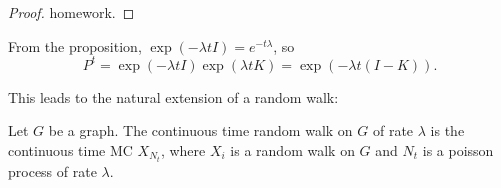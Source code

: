\begin{proof}
homework.
\end{proof}

From the proposition, $\exp(-\lambda t I) = e^{-t\lambda}$, so
\[P^t = \exp(-\lambda t I)\exp(\lambda t K) = \exp(-\lambda t(I-K)).\] 

This leads to the natural extension of a random walk: 
\begin{example}
\exlabel

Let $G$ be a graph. The continuous time random walk on $G$ of rate $\lambda$ is the continuous time MC $X_{N_t}$, where $X_i$ is a random walk on $G$ and $N_t$ is a poisson process of rate $\lambda$. 
\end{example}
